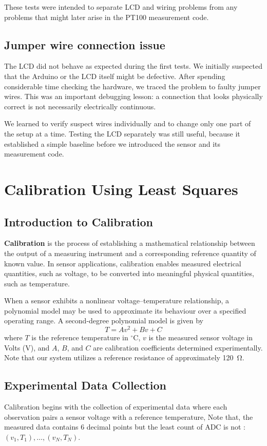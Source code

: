\documentclass[12pt,a4paper]{article}
\begin{document}
These tests were intended to separate LCD and wiring problems from any
problems that might later arise in the PT100 measurement code.

\subsection{Jumper wire connection issue}

The LCD did not behave as expected during the first tests. We initially
suspected that the Arduino or the LCD itself might be defective. After
spending considerable time checking the hardware, we traced the problem
to faulty jumper wires. This was an important debugging lesson: a
connection that looks physically correct is not necessarily electrically
continuous.

We learned to verify suspect wires individually and to change only one
part of the setup at a time. Testing the LCD separately was still useful,
because it established a simple baseline before we introduced the sensor
and its measurement code.

\section{Calibration Using Least Squares}
\subsection{Introduction to Calibration}
\textbf{Calibration} is the process of establishing a mathematical relationship between the output of a measuring instrument and a corresponding reference quantity of known value. In sensor applications, calibration enables measured electrical quantities, such as voltage, to be converted into meaningful physical quantities, such as temperature.

When a sensor exhibits a nonlinear voltage--temperature relationship, a polynomial model may be used to approximate its behaviour over a specified operating range. A second-degree polynomial model is given by
\[\boxed{T = Av^2 + Bv + C}\]
where \(T\) is the reference temperature in \(^\circ\mathrm{C}\), \(v\) is the measured sensor voltage in Volts (V), and \(A\), \(B\), and \(C\) are calibration coefficients determined experimentally. Note that our system utilizes a reference resistance of approximately \SI{120}{\ohm}.

\subsection{Experimental Data Collection}
Calibration begins with the collection of experimental data where each observation pairs a sensor voltage with a reference temperature, Note that, the measured data contains 6 decimal points but the least count of ADC is not : \((v_1, T_1), \ldots, (v_N, T_N)\).
\end{document}
